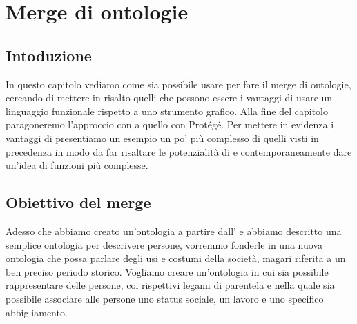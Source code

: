 \chapter{Merge di ontologie}
\label{ch4}
\section{Intoduzione}
In questo capitolo vediamo come sia possibile usare \cduce per fare il merge di ontologie, cercando di mettere in risalto quelli che possono essere i vantaggi di usare un linguaggio funzionale rispetto a uno strumento grafico. Alla fine del capitolo paragoneremo l'approccio con \cduce a quello con Protégé. Per mettere in evidenza i vantaggi di \cduce presentiamo un esempio un po' più complesso di quelli visti in precedenza in modo da far risaltare le potenzialità di \cduce e contemporaneamente dare un'idea di funzioni più complesse.

\section{Obiettivo del merge}\label{ch4.1}
Adesso che abbiamo creato un'ontologia a partire dall' e abbiamo descritto una semplice ontologia per descrivere persone, vorremmo fonderle in una nuova ontologia che possa parlare degli usi e costumi della società, magari riferita a un ben preciso periodo storico. Vogliamo creare un'ontologia in cui sia possibile rappresentare delle persone, coi rispettivi legami di parentela e nella quale sia possibile associare alle persone uno status sociale, un lavoro e uno specifico abbigliamento.
